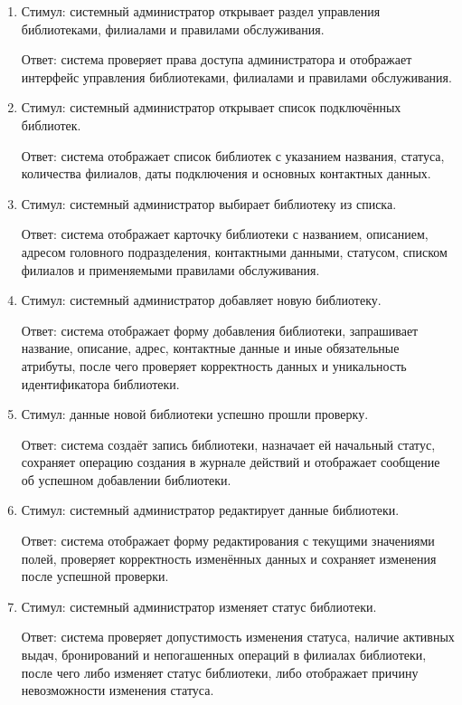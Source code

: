 \documentclass[12pt,a4paper]{article}
\begin{document}
	\begin{enumerate}
		\item Стимул: системный администратор открывает раздел управления библиотеками,
		филиалами и правилами обслуживания.
		
		Ответ: система проверяет права доступа администратора и отображает интерфейс
		управления библиотеками, филиалами и правилами обслуживания.
		
		\item Стимул: системный администратор открывает список подключённых библиотек.
		
		Ответ: система отображает список библиотек с указанием названия, статуса,
		количества филиалов, даты подключения и основных контактных данных.
		
		\item Стимул: системный администратор выбирает библиотеку из списка.
		
		Ответ: система отображает карточку библиотеки с названием, описанием,
		адресом головного подразделения, контактными данными, статусом, списком
		филиалов и применяемыми правилами обслуживания.
		
		\item Стимул: системный администратор добавляет новую библиотеку.
		
		Ответ: система отображает форму добавления библиотеки, запрашивает название,
		описание, адрес, контактные данные и иные обязательные атрибуты, после чего
		проверяет корректность данных и уникальность идентификатора библиотеки.
		
		\item Стимул: данные новой библиотеки успешно прошли проверку.
		
		Ответ: система создаёт запись библиотеки, назначает ей начальный статус,
		сохраняет операцию создания в журнале действий и отображает сообщение
		об успешном добавлении библиотеки.
		
		\item Стимул: системный администратор редактирует данные библиотеки.
		
		Ответ: система отображает форму редактирования с текущими значениями полей,
		проверяет корректность изменённых данных и сохраняет изменения после успешной
		проверки.
		
		\item Стимул: системный администратор изменяет статус библиотеки.
		
		Ответ: система проверяет допустимость изменения статуса, наличие активных
		выдач, бронирований и непогашенных операций в филиалах библиотеки, после чего
		либо изменяет статус библиотеки, либо отображает причину невозможности
		изменения статуса.
		

\end{enumerate}
\end{document}
